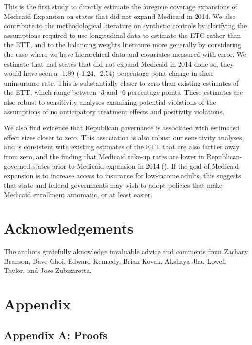 \documentclass[12pt]{article}
\begin{document}
This is the first study to directly estimate the foregone coverage expansions of Medicaid Expansion on states that did not expand Medicaid in 2014. We also contribute to the methodological literature on synthetic controls by clarifying the assumptions required to use longitudinal data to estimate the ETC rather than the ETT, and to the balancing weights literature more generally by considering the case where we have hierarchical data and covariates measured with error. We estimate that had states that did not expand Medicaid in 2014 done so, they would have seen a -1.89 (-1.24, -2.54) percentage point change in their uninsurance rate. This is substantially closer to zero than existing estimates of the ETT, which range between -3 and -6 percentage points. These estimates are also robust to sensitivity analyses examining potential violations of the assumptions of no anticipatory treatment effects and positivity violations. 

We also find evidence that Republican governance is associated with estimated effect sizes closer to zero. This association is also robust our sensitivity analyses, and is consistent with existing estimates of the ETT that are also farther away from zero, and the finding that Medicaid take-up rates are lower in Republican-governed states prior to Medicaid expansion in 2014 (\cite{sommers2012understanding}). If the goal of Medicaid expansion is to increase access to insurance for low-income adults, this suggests that state and federal governments may wish to adopt policies that make Medicaid enrollment automatic, or at least easier.

\section{Acknowledgements}

The authors gratefully aknowledge invaluable advice and comments from Zachary Branson, Dave Choi, Edward Kennedy, Brian Kovak, Akshaya Jha, Lowell Taylor, and Jose Zubizaretta.

\cleardoublepage
 

\cleardoublepage

\section{Appendix}

\subsection{Appendix A: Proofs}
\end{document}
